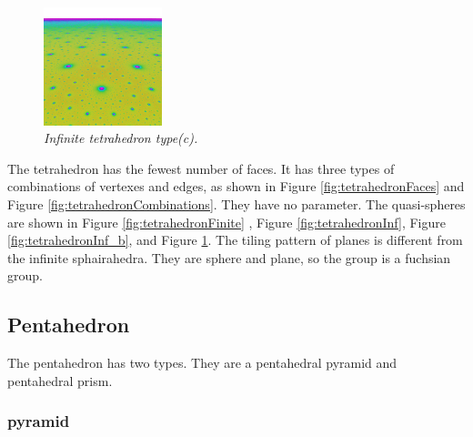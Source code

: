 \documentclass[suppldata, dvipdfmx]{interact}
\theoremstyle{plain}%
\theoremstyle{definition}
\theoremstyle{remark}
\theoremstyle{problemstyle}
\begin{document}
\begin{figure}[H]
\begin{minipage}{0.5\textwidth}
  \begin{minipage}[t]{0.24\textwidth}
   \centering
   \includegraphics[width=1.35in, height=1.35in, keepaspectratio]{./img/sphairahedron/tetrahedron/limitset_c.png}
  \end{minipage}
  \hspace*{\fill}
  \caption{\textit{Infinite tetrahedron type(c).}}
  \label{fig:tetrahedronInf_c}
 \end{minipage}
\end{figure}

The tetrahedron has the fewest number of faces.
It has three types of combinations of vertexes and edges, as shown in
Figure \ref{fig:tetrahedronFaces} and Figure \ref{fig:tetrahedronCombinations}.
They have no parameter.
The quasi-spheres are shown in Figure \ref{fig:tetrahedronFinite}
, Figure \ref{fig:tetrahedronInf}, Figure \ref{fig:tetrahedronInf_b},
and Figure \ref{fig:tetrahedronInf_c}.
The tiling pattern of planes is different from the infinite sphairahedra.
They are sphere and plane, so the group is a fuchsian group.

\subsection{Pentahedron}

The pentahedron has two types. They are a pentahedral pyramid and pentahedral prism.

\subsubsection{pyramid}
\end{document}
